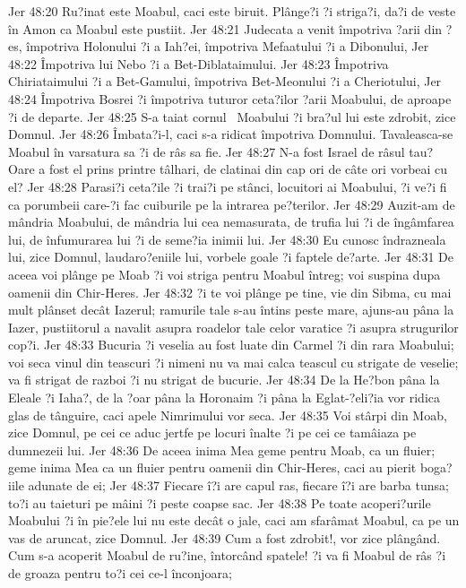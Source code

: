 Jer 48:20  Ru?inat este Moabul, caci este biruit. Plânge?i ?i striga?i, da?i de veste în Amon ca Moabul este pustiit.
Jer 48:21  Judecata a venit împotriva ?arii din ?es, împotriva Holonului ?i a Iah?ei, împotriva Mefaatului ?i a Dibonului,
Jer 48:22  Împotriva lui Nebo ?i a Bet-Diblataimului.
Jer 48:23  Împotriva Chiriataimului ?i a Bet-Gamului, împotriva Bet-Meonului ?i a Cheriotului,
Jer 48:24  Împotriva Bosrei ?i împotriva tuturor ceta?ilor ?arii Moabului, de aproape ?i de departe.
Jer 48:25  S-a taiat cornul  Moabului ?i bra?ul lui este zdrobit, zice Domnul.
Jer 48:26  Îmbata?i-l, caci s-a ridicat împotriva Domnului. Tavaleasca-se Moabul în varsatura sa ?i de râs sa fie.
Jer 48:27  N-a fost Israel de râsul tau? Oare a fost el prins printre tâlhari, de clatinai din cap ori de câte ori vorbeai cu el?
Jer 48:28  Parasi?i ceta?ile ?i trai?i pe stânci, locuitori ai Moabului, ?i ve?i fi ca porumbeii care-?i fac cuiburile pe la intrarea pe?terilor.
Jer 48:29  Auzit-am de mândria Moabului, de mândria lui cea nemasurata, de trufia lui ?i de îngâmfarea lui, de înfumurarea lui ?i de seme?ia inimii lui.
Jer 48:30  Eu cunosc îndrazneala lui, zice Domnul, laudaro?eniile lui, vorbele goale ?i faptele de?arte.
Jer 48:31  De aceea voi plânge pe Moab ?i voi striga pentru Moabul întreg; voi suspina dupa oamenii din Chir-Heres.
Jer 48:32  ?i te voi plânge pe tine, vie din Sibma, cu mai mult plânset decât Iazerul; ramurile tale s-au întins peste mare, ajuns-au pâna la Iazer, pustiitorul a navalit asupra roadelor tale celor varatice ?i asupra strugurilor cop?i.
Jer 48:33  Bucuria ?i veselia au fost luate din Carmel ?i din rara Moabului; voi seca vinul din teascuri ?i nimeni nu va mai calca teascul cu strigate de veselie; va fi strigat de razboi ?i nu strigat de bucurie.
Jer 48:34  De la He?bon pâna la Eleale ?i Iaha?, de la ?oar pâna la Horonaim ?i pâna la Eglat-?eli?ia vor ridica glas de tânguire, caci apele Nimrimului vor seca.
Jer 48:35  Voi stârpi din Moab, zice Domnul, pe cei ce aduc jertfe pe locuri înalte ?i pe cei ce tamâiaza pe dumnezeii lui.
Jer 48:36  De aceea inima Mea geme pentru Moab, ca un fluier; geme inima Mea ca un fluier pentru oamenii din Chir-Heres, caci au pierit boga?iile adunate de ei;
Jer 48:37  Fiecare î?i are capul ras, fiecare î?i are barba tunsa; to?i au taieturi pe mâini ?i peste coapse sac.
Jer 48:38  Pe toate acoperi?urile Moabului ?i în pie?ele lui nu este decât o jale, caci am sfarâmat Moabul, ca pe un vas de aruncat, zice Domnul.
Jer 48:39  Cum a fost zdrobit!, vor zice plângând. Cum s-a acoperit Moabul de ru?ine, întorcând spatele! ?i va fi Moabul de râs ?i de groaza pentru to?i cei ce-l înconjoara;
